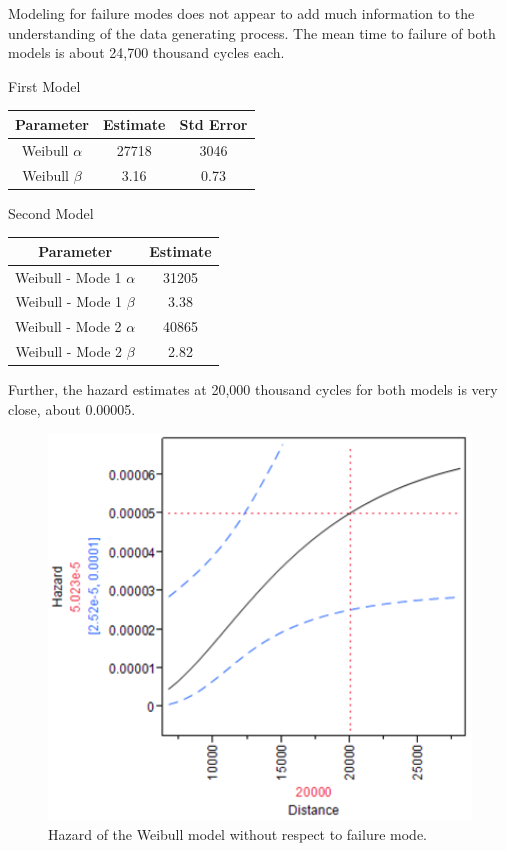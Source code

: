 \documentclass{article}
\begin{document}
\begin{enumerate}
\begin{enumerate}
  Modeling for failure modes does not appear to add much information to the understanding of the data generating process.  The mean time to failure of both models is about 24,700 thousand cycles each.
  
\begin{center}
First Model\\
\begin{tabular}{c c c}
\hline
Parameter & Estimate & Std Error\\
\hline
Weibull \(\alpha \) & 27718 & 3046\\
Weibull \(\beta \) & 3.16 & 0.73\\
\hline
\end{tabular}
\end{center}

\begin{center}
Second Model\\
\begin{tabular}{c c}
\hline
Parameter & Estimate\\
\hline
Weibull - Mode 1 \(\alpha \) & 31205\\
Weibull - Mode 1 \(\beta \) & 3.38\\
Weibull - Mode 2 \(\alpha \) & 40865\\
Weibull - Mode 2 \(\beta \) & 2.82\\
\hline
\end{tabular}
\end{center}
  
Further, the hazard estimates at 20,000 thousand cycles for both models is very close, about 0.00005.\\

\begin{center}
        \FloatBarrier
      \begin{figure}
        \centering
        \includegraphics[width = 5in]{problem5_hazard1.png}
        \caption{Hazard of the Weibull model without respect to failure mode.}
      \end{figure}
      \FloatBarrier
  \end{center}
  

\end{enumerate}
\end{enumerate}
\end{document}
